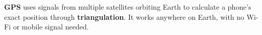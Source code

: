 \sectionrule

\begin{bigidea}
  \textbf{GPS} uses signals from multiple satellites orbiting Earth to calculate
  a phone's exact position through \textbf{triangulation}.
  It works anywhere on Earth, with no Wi-Fi or mobile signal needed.
\end{bigidea}

